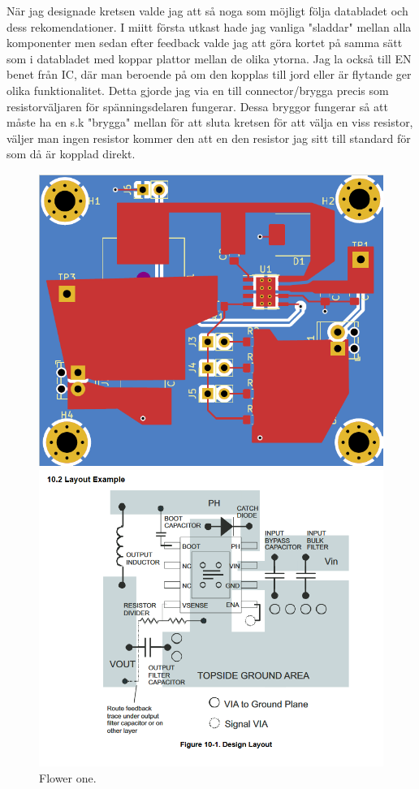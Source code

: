 \documentclass{article}
\begin{document}
När jag designade kretsen valde jag att så noga som möjligt följa databladet och dess
rekomendationer. I miitt första utkast hade jag vanliga "sladdar" mellan alla komponenter
men sedan efter feedback valde jag att göra kortet på samma sätt som i databladet med 
koppar plattor mellan de olika ytorna. Jag la också till EN benet från IC, där man
beroende på om den kopplas till jord eller är flytande ger olika funktionalitet. 
Detta gjorde jag via en till connector/brygga precis som resistorväljaren för
spänningsdelaren fungerar. Dessa bryggor fungerar så att måste ha en s.k "brygga" mellan
för att sluta kretsen för att välja en viss resistor, väljer man ingen resistor kommer den
att en den resistor jag sitt till standard för som då är kopplad direkt.


\begin{figure}[htp]
  \centering
  \begin{minipage}[b]{0.4\textwidth}
    \includegraphics[width=\textwidth]{img/nylayout.png}
    \caption{Flower one.}
  \end{minipage}
  \hfill
  \begin{minipage}[b]{0.4\textwidth}
    \includegraphics[width=\textwidth]{img/layout.png}

\end{minipage}
\end{figure}
\end{document}
